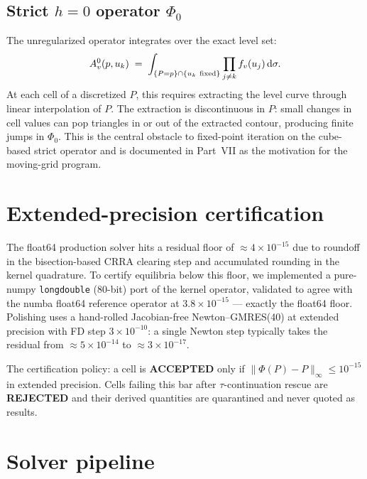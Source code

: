 \documentclass[11pt]{article}
\newcommand{\1}{\mathbf{1}}
\begin{document}
\subsection{Strict $h=0$ operator $\Phi_0$}

The unregularized operator integrates over the exact level set:
\begin{equation}
A_v^0(p, u_k) \;=\; \int_{\{P=p\}\cap\{u_k\ \rm fixed\}}
\prod_{j\ne k} f_v(u_j) \, \mathrm{d}\sigma.
\end{equation}
At each cell of a discretized $P$, this requires extracting the level
curve through linear interpolation of $P$.  The extraction is
discontinuous in $P$: small changes in cell values can pop triangles in
or out of the extracted contour, producing finite jumps in $\Phi_0$.
This is the central obstacle to fixed-point iteration on the cube-based
strict operator and is documented in Part~VII as the motivation for the
moving-grid program.

\section{Extended-precision certification}

The float64 production solver hits a residual floor of
$\approx 4 \times 10^{-15}$ due to roundoff in the bisection-based CRRA
clearing step and accumulated rounding in the kernel quadrature.  To
certify equilibria below this floor, we implemented a pure-numpy
\texttt{longdouble} (80-bit) port of the kernel operator, validated to
agree with the numba float64 reference operator at $3.8\times 10^{-15}$
--- exactly the float64 floor.  Polishing uses a hand-rolled
Jacobian-free Newton--GMRES(40) at extended precision with FD step
$3\times 10^{-10}$: a single Newton step typically takes the residual
from $\approx 5\times 10^{-14}$ to $\approx 3\times 10^{-17}$.

The certification policy: a cell is \textbf{ACCEPTED} only if
$\|\Phi(P)-P\|_\infty \le 10^{-15}$ in extended precision.  Cells
failing this bar after $\tau$-continuation rescue are \textbf{REJECTED}
and their derived quantities are quarantined and never quoted as
results.

\section{Solver pipeline}
\end{document}
